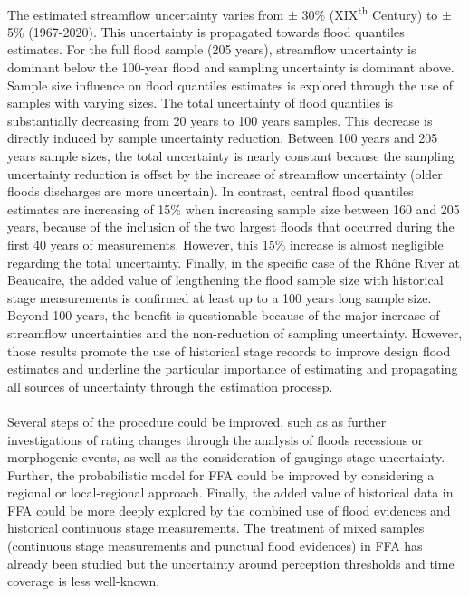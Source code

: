 \documentclass[11pt]{article}
\begin{document}
    \paragraph{} The estimated streamflow uncertainty varies from $\pm$ 30\% (XIX\textsuperscript{th} Century) to $\pm$ 5\% (1967-2020). This uncertainty is propagated towards flood quantiles estimates. For the full flood sample (205 years), streamflow uncertainty is dominant below the 100-year flood and sampling uncertainty is dominant above. Sample size influence on flood quantiles estimates is explored through the use of samples with varying sizes. The total uncertainty of flood quantiles is substantially decreasing from 20 years to 100 years samples. This decrease is directly induced by sample uncertainty reduction. Between 100 years and 205 years sample sizes, the total uncertainty is nearly constant because the sampling uncertainty reduction is offset by the increase of streamflow uncertainty (older floods discharges are more uncertain). In contrast, central flood quantiles estimates are increasing of 15\% when increasing sample size between 160 and 205 years, because of the inclusion of the two largest floods that occurred during the first 40 years of measurements. However, this 15\% increase is almost negligible regarding the total uncertainty. Finally, in the specific case of the Rhône River at Beaucaire, the added value of lengthening the flood sample size with historical stage measurements is confirmed at least up to a 100 years long sample size. Beyond 100 years, the benefit is questionable because of the major increase of streamflow uncertainties and the non-reduction of sampling uncertainty. However, those results promote the use of historical stage records to improve design flood estimates and underline the particular importance of estimating and propagating all sources of uncertainty through the estimation processp. 

    \paragraph{} Several steps of the procedure could be improved, such as as further investigations of rating changes through the analysis of floods recessions or morphogenic events, as well as the consideration of gaugings stage uncertainty. Further, the probabilistic model for FFA could be improved by considering a regional or local-regional approach. Finally, the added value of historical data in FFA could be more deeply explored by the combined use of flood evidences and historical continuous stage measurements. The treatment of mixed samples (continuous stage measurements and punctual flood evidences) in FFA has already been studied but the uncertainty around perception thresholds and time coverage is less well-known. 
\end{document}
